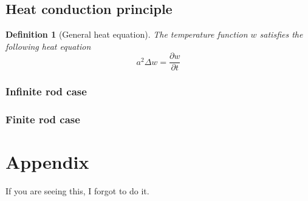 \documentclass[oneside,11pt,pdftex,final]{book}%
\numberwithin{equation}{section}
\newtheorem{definition}[theorem]{Definition}
\numberwithin{section}{chapter}
\numberwithin{equation}{chapter}
\begin{document}
\section{Heat conduction principle}
\begin{definition}[General heat equation]
	The temperature function $ w $ satisfies the following heat equation
	\[a^2 \Delta w = \frac{\partial w}{\partial t}\]
\end{definition}
\subsection{Infinite rod case}
\subsection{Finite rod case}


\backmatter

\chapter*{Appendix}
If you are seeing this, I forgot to do it.




\thispagestyle{empty}%
{\ }
\newpage
\end{document}
